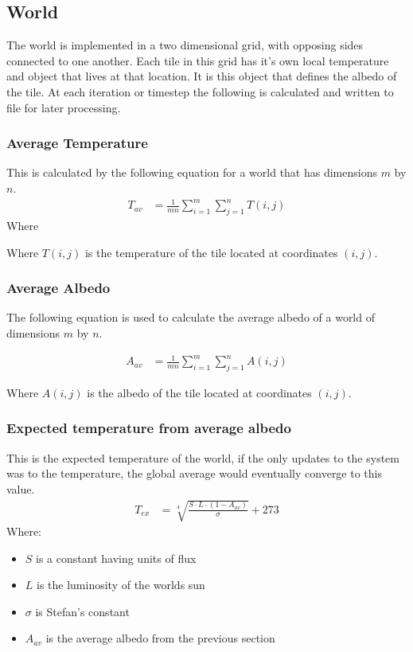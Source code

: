 \documentclass[12pt]{article}
\begin{document}
\subsection{World} The world is implemented in a two dimensional grid,
with opposing sides connected to one another. Each tile in this grid
has it's own local temperature and object that lives at that
location. It is this object that defines the albedo of the tile. At
each iteration or timestep the following is calculated and written to
file for later processing.

\subsubsection{Average Temperature}
This is calculated by the following equation for a world that has
dimensions $m$ by $n$.
\begin{align}
  T_{av} &= \frac{1}{mn}\sum\limits_{i=1}^m\sum\limits_{j=1}^nT(i,j)
\end{align}
Where


Where $T(i,j)$ is the temperature of the tile located at coordinates
$(i,j)$.

\subsubsection{Average Albedo}
The following equation is used to calculate the average albedo of a
world of dimensions $m$ by $n$.

\begin{align}
  A_{av} &= \frac{1}{mn}\sum\limits_{i=1}^m\sum\limits_{j=1}^nA(i,j)
\end{align}

Where $A(i,j)$ is the albedo of the tile located at coordinates
$(i,j)$.

\subsubsection{Expected temperature from average albedo}
This is the expected temperature of the world, if the only updates to
the system was to the temperature, the global average would eventually
converge to this value.
\begin{align}
  T_{ex} &= \sqrt[4]{\frac{S\cdot L \cdot (1-A_{av})}{\sigma}} + 273
\end{align}
Where:
\begin{itemize}
\item $S$ is a constant having units of flux
\item $L$ is the luminosity of the worlds sun
\item $\sigma$ is Stefan's constant
\item $A_{av}$ is the average albedo from the previous section
\end{itemize}
\end{document}
